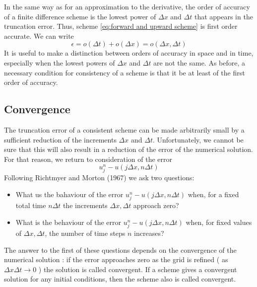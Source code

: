 In the same way as for an approximation to the deri­vative, the order of accuracy of a finite difference scheme is the lowest power of $\Delta x$ and $\Delta t$ that appears in the truncation error. Thus, scheme \ref{eq:forward and upward scheme} is first order accurate. We can write
$$\epsilon=o(\Delta t)+o(\Delta x)=o(\Delta x,\Delta t)$$
It is useful to make a distinction between orders of accuracy in space and in time, especially when the lowest powers of $\Delta x$ and $\Delta t$ are not the same. As before, a necessary condition for consistency of a scheme is that it be at least of the first order of accuracy.
\subsection{Convergence}
The truncation error of a consistent scheme can be made arbitrarily small by a sufficient reduction of the increments $\Delta x$ and $\Delta t$. Unfortunately, we cannot be sure that this will also result in a reduction of the error of the numerical solution. For that reason, we return to consideration of the error
$$u_j^n-u(j\Delta x,n\Delta t)$$
Following Richtmyer and Morton (1967) we ask two questions:
\begin{itemize}
	\item What us the bahaviour of the error $u_j^n-u(j\Delta x, n\Delta t)$ when, for a fixed total time $n\Delta t$ the increments $\Delta x, \Delta t$ approach zero?
	\item What is the behaviour of the error $u_j^n-u(j\Delta x, n\Delta t)$ when, for fixed values of $\Delta x, \Delta t$, the number of time steps $n$ increases?
\end{itemize}

The answer to the first of these questions depends on the convergence of the numerical solution : if the error approaches zero as the grid is refined ( as $\Delta x\Delta t\rightarrow 0$ ) the solution is called convergent. If a scheme gives a convergent solution for any initial conditions, then the scheme also is called convergent.

